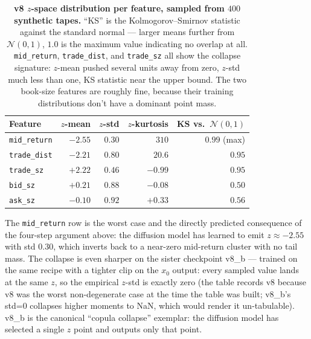 \documentclass[journal]{IEEEtran}
\theoremstyle{definition}   %
\begin{document}
\begin{table}[ht]
    \centering
    \footnotesize
    \begin{tabular}{lrrrr}
        \toprule
        Feature & $z$-mean & $z$-std & $z$-kurtosis & KS vs.\ $\mathcal{N}(0,1)$ \\
        \midrule
        \texttt{mid\_return}  & $-2.55$ & $0.30$ & $310$  & $0.99$ (max) \\
        \texttt{trade\_dist}  & $-2.21$ & $0.80$ & $20.6$ & $0.95$ \\
        \texttt{trade\_sz}    & $+2.22$ & $0.46$ & $-0.99$& $0.95$ \\
        \texttt{bid\_sz}      & $+0.21$ & $0.88$ & $-0.08$& $0.50$ \\
        \texttt{ask\_sz}      & $-0.10$ & $0.92$ & $+0.33$& $0.56$ \\
        \bottomrule
    \end{tabular}
    \caption{\textbf{v8 $z$-space distribution per feature, sampled
    from $400$ synthetic tapes.} ``KS'' is the
    Kolmogorov--Smirnov statistic against the standard normal ---
    larger means further from $\mathcal{N}(0, 1)$, $1.0$ is the
    maximum value indicating no overlap at all. \texttt{mid\_return},
    \texttt{trade\_dist}, and \texttt{trade\_sz} all show the
    collapse signature: $z$-mean pushed several units away from
    zero, $z$-std much less than one, KS statistic near the upper
    bound. The two book-size features are roughly fine, because
    their training distributions don't have a dominant point mass.}
    \label{tab:v8_z_collapse}
\end{table}

The \texttt{mid\_return} row is the worst case and the directly
predicted consequence of the four-step argument above: the
diffusion model has learned to emit $z \approx -2.55$ with std
$0.30$, which inverts back to a near-zero mid-return cluster with
no tail mass. The collapse is even sharper on the sister
checkpoint v8\_b --- trained on the same recipe with a tighter
clip on the $x_0$ output: every sampled value lands at the same
$z$, so the empirical $z$-std is exactly zero (the table records
v8 because v8 was the worst non-degenerate case at the time the
table was built; v8\_b's std=$0$ collapses higher moments to NaN,
which would render it un-tabulable). v8\_b is the canonical
``copula collapse'' exemplar: the diffusion model has selected a
single $z$ point and outputs only that point.
\end{document}
